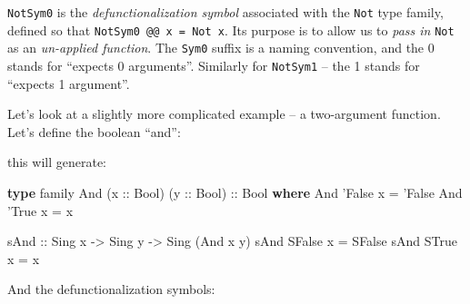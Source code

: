 \documentclass[]{article}
\newenvironment{Shaded}{}{}
\newcommand{\DataTypeTok}[1]{\textcolor[rgb]{0.56,0.13,0.00}{#1}}
\newcommand{\FunctionTok}[1]{\textcolor[rgb]{0.02,0.16,0.49}{#1}}
\newcommand{\KeywordTok}[1]{\textcolor[rgb]{0.00,0.44,0.13}{\textbf{#1}}}
\newcommand{\NormalTok}[1]{#1}
\newcommand{\OtherTok}[1]{\textcolor[rgb]{0.00,0.44,0.13}{#1}}
\begin{document}
\texttt{NotSym0} is the \emph{defunctionalization symbol} associated with the
\texttt{Not} type family, defined so that \texttt{NotSym0\ @@\ x\ =\ Not\ x}.
Its purpose is to allow us to \emph{pass in} \texttt{Not} as an \emph{un-applied
function}. The \texttt{Sym0} suffix is a naming convention, and the 0 stands for
``expects 0 arguments''. Similarly for \texttt{NotSym1} -- the 1 stands for
``expects 1 argument''.

Let's look at a slightly more complicated example -- a two-argument function.
Let's define the boolean ``and'':

\begin{Shaded}
\end{Shaded}

this will generate:

\begin{Shaded}
\begin{Highlighting}[]
\KeywordTok{type}\NormalTok{ family }\DataTypeTok{And}\NormalTok{ (}\OtherTok{x ::} \DataTypeTok{Bool}\NormalTok{) (}\OtherTok{y ::} \DataTypeTok{Bool}\NormalTok{)}\OtherTok{ ::} \DataTypeTok{Bool} \KeywordTok{where}
    \DataTypeTok{And}\NormalTok{ '}\DataTypeTok{False}\NormalTok{ x }\FunctionTok{=}\NormalTok{ '}\DataTypeTok{False}
    \DataTypeTok{And}\NormalTok{ '}\DataTypeTok{True}\NormalTok{  x }\FunctionTok{=}\NormalTok{ x}

\OtherTok{sAnd ::} \DataTypeTok{Sing}\NormalTok{ x }\OtherTok{->} \DataTypeTok{Sing}\NormalTok{ y }\OtherTok{->} \DataTypeTok{Sing}\NormalTok{ (}\DataTypeTok{And}\NormalTok{ x y)}
\NormalTok{sAnd }\DataTypeTok{SFalse}\NormalTok{ x }\FunctionTok{=} \DataTypeTok{SFalse}
\NormalTok{sAnd }\DataTypeTok{STrue}\NormalTok{  x }\FunctionTok{=}\NormalTok{ x}
\end{Highlighting}
\end{Shaded}

And the defunctionalization symbols:
\end{document}
